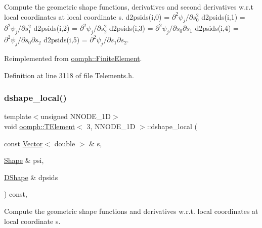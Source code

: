 Compute the geometric shape functions, derivatives and second derivatives w.\+r.\+t local coordinates at local coordinate s. d2psids(i,0) = $ \partial^2 \psi_j / \partial s_0^2 $ d2psids(i,1) = $ \partial^2 \psi_j / \partial s_1^2 $ d2psids(i,2) = $ \partial^2 \psi_j / \partial s_2^2 $ d2psids(i,3) = $ \partial^2 \psi_j / \partial s_0 \partial s_1 $ d2psids(i,4) = $ \partial^2 \psi_j / \partial s_0 \partial s_2 $ d2psids(i,5) = $ \partial^2 \psi_j / \partial s_1 \partial s_2 $. 



Reimplemented from \hyperlink{classoomph_1_1FiniteElement_a53e5051582d9da07b9d35da9debd0cd7}{oomph\+::\+Finite\+Element}.



Definition at line 3118 of file Telements.\+h.

\mbox{\label{classoomph_1_1TElement_3_013_00_01NNODE__1D_01_4_ae78236047f635d9d739b91efb36f9922}} 
\subsubsection{\texorpdfstring{dshape\+\_\+local()}{dshape\_local()}}
{\footnotesize\ttfamily template$<$unsigned N\+N\+O\+D\+E\+\_\+1D$>$ \\
void \hyperlink{classoomph_1_1TElement}{oomph\+::\+T\+Element}$<$ 3, N\+N\+O\+D\+E\+\_\+1D $>$\+::dshape\+\_\+local (\begin{DoxyParamCaption}\item[{const \hyperlink{classoomph_1_1Vector}{Vector}$<$ double $>$ \&}]{s,  }\item[{\hyperlink{classoomph_1_1Shape}{Shape} \&}]{psi,  }\item[{\hyperlink{classoomph_1_1DShape}{D\+Shape} \&}]{dpsids }\end{DoxyParamCaption}) const\hspace{0.3cm}{\ttfamily [inline]}, {\ttfamily [virtual]}}



Compute the geometric shape functions and derivatives w.\+r.\+t. local coordinates at local coordinate s. 



